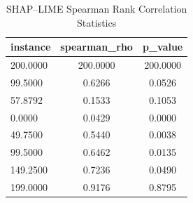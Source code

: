\begin{table}
\centering
\caption{SHAP–LIME Spearman Rank Correlation Statistics}
\label{tab:agreement}
\begin{tabular}{lcc}
\toprule
instance & spearman_rho & p_value \\
\midrule
200.0000 & 200.0000 & 200.0000 \\
99.5000 & 0.6266 & 0.0526 \\
57.8792 & 0.1533 & 0.1053 \\
0.0000 & 0.0429 & 0.0000 \\
49.7500 & 0.5440 & 0.0038 \\
99.5000 & 0.6462 & 0.0135 \\
149.2500 & 0.7236 & 0.0490 \\
199.0000 & 0.9176 & 0.8795 \\
\bottomrule
\end{tabular}
\end{table}
